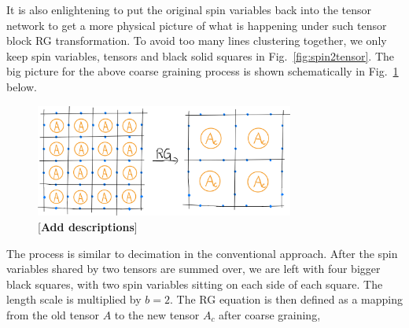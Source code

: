 \documentclass[aps,prb,reprint,superscriptaddress]{revtex4-2}
\begin{document}
%
It is also enlightening to put the original spin variables back into the
tensor network to get a more physical picture of what is happening under
such tensor block RG transformation. To avoid too many lines clustering
together, we only keep spin variables, tensors and black solid squares
in Fig.~\ref{fig:spin2tensor}. The big picture for the above coarse
graining process is shown schematically in Fig.~\ref{fig:rgschem} below.
%
\begin{figure}[h]
    \includegraphics[width=8.5cm]{./figs/rgschem}
    \caption{\label{fig:rgschem}[\textbf{Add descriptions}]}
\end{figure}
%
The process is similar to decimation in the conventional approach. After
the spin variables shared by two tensors are summed over, we are left
with four bigger black squares, with two spin variables sitting on each
side of each square. The length scale is multiplied by $b = 2$. The RG
equation is then defined as a mapping from the old tensor $A$ to the new
tensor $A_c$ after coarse graining,
%
\end{document}
